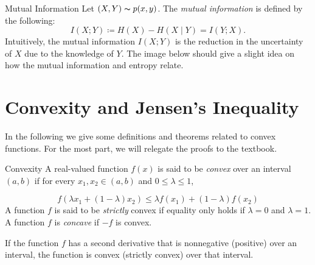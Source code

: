 \begin{defn}{Mutual Information}{}
  Let \((X,Y) \thicksim p(x,y)\). The \textit{mutual information} is defined by the following:
  \[
  I(X;Y) \coloneqq H(X) - H(X\mid Y) = I(Y;X) . 
\]
Intuitively, the mutual information \(I(X;Y)\) is the reduction in the uncertainty of \(X\) due to the knowledge of \(Y\). The image below should give a slight idea on how the mutual information and entropy relate. 



\begin{center}
\end{center}



\end{defn}

\section{Convexity and Jensen's Inequality}

In the following we give some definitions and theorems related to convex functions. For the most part, we will relegate the proofs to the textbook.  
\begin{defn}{Convexity  }{}
A real-valued function \(f(x)\) is said to be \textit{convex} over an interval \((a,b)\) if for every \( x_1,x_2 \in (a, b)\) and \(0\leq \lambda \leq 1\),  

\[
  f(\lambda x_1 + (1 -\lambda )x_2) \leq  \lambda f(x_1) + (1 -\lambda )f(x_2)
\]
A function \(f\) is said to be \textit{strictly } convex if equality only holds if \(\lambda = 0\) and \(\lambda = 1\). A function \(f\) is \textit{concave } if \(- f\) is convex.

\end{defn}


\begin{thrm}{}{}
If the function \(f\) has a second derivative that is nonnegative (positive) over an interval, the function is convex (strictly convex) over that interval. 


\end{thrm}


